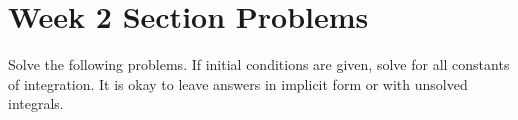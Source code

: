 \documentclass[letterpaper, fontsize=11pt]{scrartcl} %
\numberwithin{equation}{section} %
\numberwithin{figure}{section} %
\numberwithin{table}{section} %
\begin{document}

\newcommand{\horrule}[1]{\rule{\linewidth}{#1}} %


\section*{Week 2 Section Problems}
\par Solve the following problems. If initial conditions are given, solve for all constants of integration. It is okay to leave answers in implicit form or with unsolved integrals. 
\end{document}
